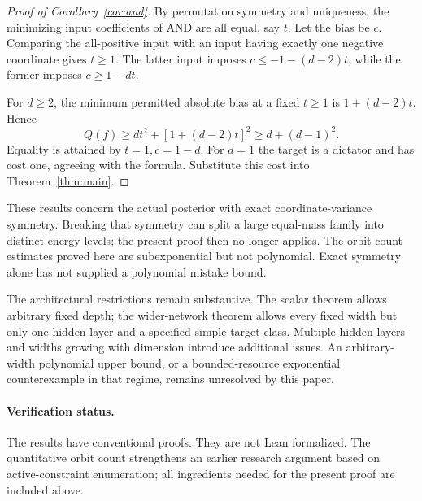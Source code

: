\documentclass[11pt]{article}
\begin{document}
\begin{proof}[Proof of Corollary~\ref{cor:and}]
By permutation symmetry and uniqueness, the minimizing input coefficients of AND are all equal, say $t$. Let the bias be $c$. Comparing the all-positive input with an input having exactly one negative coordinate gives $t\ge1$. The latter input imposes $c\le-1-(d-2)t$, while the former imposes $c\ge1-dt$.

For $d\ge2$, the minimum permitted absolute bias at a fixed $t\ge1$ is $1+(d-2)t$. Hence
\[
 Q(f)\ge dt^2+[1+(d-2)t]^2\ge d+(d-1)^2.
\]
Equality is attained by $t=1,c=1-d$. For $d=1$ the target is a dictator and has cost one, agreeing with the formula. Substitute this cost into Theorem~\ref{thm:main}.
\end{proof}

These results concern the actual posterior with exact coordinate-variance symmetry. Breaking that symmetry can split a large equal-mass family into distinct energy levels; the present proof then no longer applies. The orbit-count estimates proved here are subexponential but not polynomial. Exact symmetry alone has not supplied a polynomial mistake bound.

The architectural restrictions remain substantive. The scalar theorem allows arbitrary fixed depth; the wider-network theorem allows every fixed width but only one hidden layer and a specified simple target class. Multiple hidden layers and widths growing with dimension introduce additional issues. An arbitrary-width polynomial upper bound, or a bounded-resource exponential counterexample in that regime, remains unresolved by this paper.

\paragraph{Verification status.} The results have conventional proofs. They are not Lean formalized. The quantitative orbit count strengthens an earlier research argument based on active-constraint enumeration; all ingredients needed for the present proof are included above.
\end{document}
